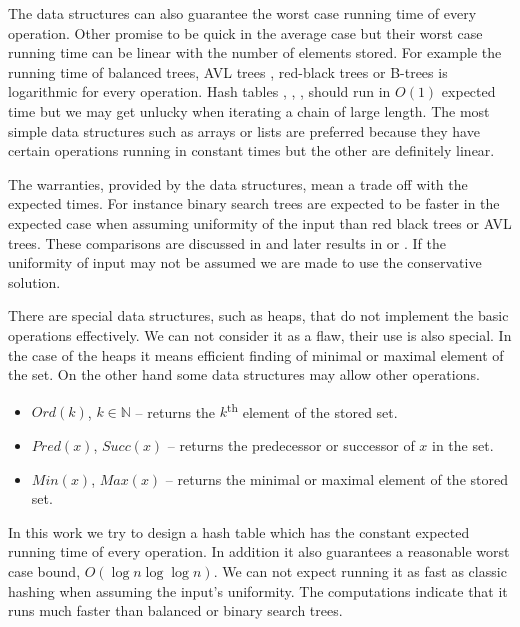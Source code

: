 The data structures can also guarantee the worst case running time of every operation. Other promise to be quick in the average case but their worst case running time can be linear with the number of elements stored. For example the running time of balanced trees, AVL trees \cite{AVL}, red-black trees \cite{DBLP:conf/focs/GuibasS78} or B-trees \cite{DBLP:journals/acta/BayerM72} is logarithmic for every operation. Hash tables \cite{DBLP:books/sp/MehlhornS2008}, \cite{VK-skripta}, \cite{DBLP:journals/jcss/CarterW79}, \cite{The-art-of-computer-programming} should run in $O(1)$ expected time but we may get unlucky when iterating a chain of large length. The most simple data structures such as arrays or lists are preferred because they have certain operations running in constant times but the other are definitely linear.

The warranties, provided by the data structures, mean a trade off with the expected times. For instance binary search trees are expected to be faster in the expected case when assuming uniformity of the input than red black trees or AVL trees. These comparisons are discussed in \cite{63531} and later results in \cite{765571} or \cite{DBLP:journals/algorithmica/Drmota01}. If the uniformity of input may not be assumed we are made to use the conservative solution.

There are special data structures, such as heaps, that do not implement the basic operations effectively. We can not consider it as a flaw, their use is also special. In the case of the heaps it means efficient finding of minimal or maximal element of the set. On the other hand some data structures may allow other operations. 
\begin{itemize}
\item $Ord(k)$, $k \in \mathbb{N}$ -- returns the $k$\textsuperscript{th} element of the stored set.
\item $Pred(x)$, $Succ(x)$ -- returns the predecessor or successor of $x$ in the set.
\item $Min(x)$, $Max(x)$ -- returns the minimal or maximal element of the stored set.
\end{itemize}

In this work we try to design a hash table which has the constant expected running time of every operation. In addition it also guarantees a reasonable worst case bound, $O\left(\log n \log \log n\right)$. We can not expect running it as fast as classic hashing when assuming the input's uniformity. The computations indicate that it runs much faster than balanced or binary search trees.

